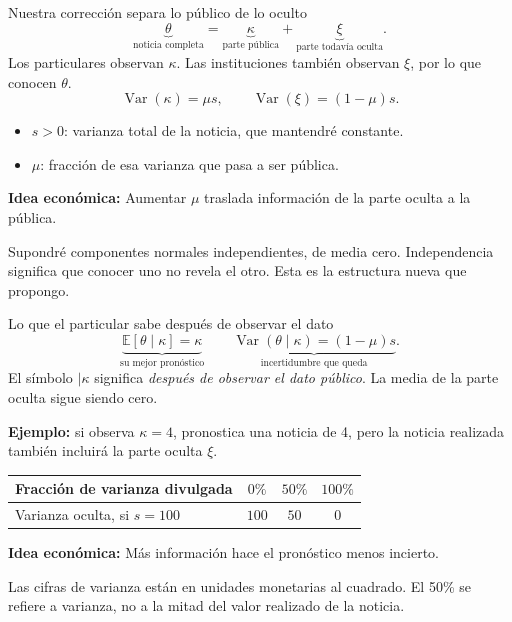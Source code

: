 \documentclass[aspectratio=169,11pt]{beamer}
\newcommand{\E}{\mathbb E}
\newcommand{\Var}{\operatorname{Var}}
\newcommand{\idea}[1]{\par\medskip\textbf{Idea económica:} #1}
\begin{document}
\begin{frame}{Nuestra corrección separa lo público de lo oculto}
 \[
  \underbrace{\theta}_{\text{noticia completa}}
  =\underbrace{\kappa}_{\text{parte pública}}
   +\underbrace{\xi}_{\text{parte todavía oculta}}.
 \]
 Los particulares observan \(\kappa\).
 Las instituciones también observan \(\xi\), por lo que conocen \(\theta\).
 \[
  \Var(\kappa)=\mu s,\qquad \Var(\xi)=(1-\mu)s.
 \]
 \begin{itemize}
  \item \(s>0\): varianza total de la noticia, que mantendré constante.
  \item \(\mu\): fracción de esa varianza que pasa a ser pública.
 \end{itemize}
 \idea{Aumentar \(\mu\) traslada información de la parte oculta a la pública.}
 \medskip\par\small
 Supondré componentes normales independientes, de media cero.
 Independencia significa que conocer uno no revela el otro.
 Esta es la estructura nueva que propongo.
\end{frame}
\begin{frame}{Lo que el particular sabe después de observar el dato}
 \[
  \underbrace{\E[\theta\mid\kappa]=\kappa}_{\text{su mejor pronóstico}}
  \qquad
  \underbrace{\Var(\theta\mid\kappa)=(1-\mu)s}_{\text{incertidumbre que queda}}.
 \]
 El símbolo \(\mid\kappa\) significa \emph{después de observar el dato público}.
 La media de la parte oculta sigue siendo cero.
 \medskip
 \par\textbf{Ejemplo:} si observa \(\kappa=4\), pronostica una noticia de 4,
 pero la noticia realizada también incluirá la parte oculta \(\xi\).
 \begin{center}
 \begin{tabular}{lccc}
 \toprule
 Fracción de varianza divulgada & \(0\%\) & \(50\%\) & \(100\%\)\\
 \midrule
 Varianza oculta, si \(s=100\) & \(100\) & \(50\) & \(0\)\\
 \bottomrule
 \end{tabular}
 \end{center}
 \idea{Más información hace el pronóstico menos incierto.}
 \small\par\medskip
 Las cifras de varianza están en unidades monetarias al cuadrado.
 El 50\% se refiere a varianza, no a la mitad del valor realizado de la noticia.
\end{frame}
\end{document}

